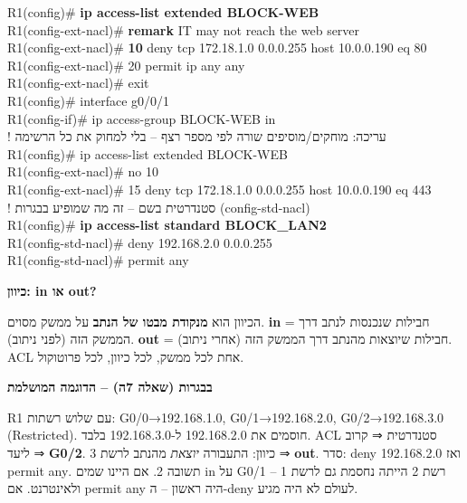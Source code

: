 \documentclass[11pt]{article}
\newcommand{\enLR}[1]{\textenglish{#1}}
\newcommand{\code}[1]{\textenglish{\codefont #1}}
\newcommand{\subheading}[1]{\vskip6pt{\bfseries\color{h3}#1\par}\vskip2pt}
\newcommand{\boxtitle}[1]{{\bfseries\color{boxti}#1}}
\newenvironment{exambox}{\colorlet{boxti}{exati}\begin{mdframed}[backgroundcolor=exabg,linecolor=exafr,rightline=true,leftline=false,topline=false,bottomline=false,linewidth=2pt,innertopmargin=6pt,innerbottommargin=6pt,innerleftmargin=8pt,innerrightmargin=8pt,skipabove=6pt,skipbelow=6pt]}{\end{mdframed}}
\begin{document}
\begin{codebox}\begin{english}\codefont\footnotesize\color{cfg}\setlength{\parindent}{0pt}
R1(config)\# \textcolor{cbold}{\textbf{ip access-list extended BLOCK-WEB}}\\
R1(config-ext-nacl)\# \textcolor{cbold}{\textbf{remark}} IT may not reach the web server\\
R1(config-ext-nacl)\# \textcolor{cbold}{\textbf{10}} deny tcp 172.18.1.0 0.0.0.255 host 10.0.0.190 eq 80\\
R1(config-ext-nacl)\# 20 permit ip any any\\
R1(config-ext-nacl)\# exit\\
R1(config)\# interface g0/0/1\\
R1(config-if)\# ip access-group BLOCK-WEB in\\
\textcolor{ccom}{\texthebrew{! עריכה: מוחקים/מוסיפים שורה לפי מספר רצף – בלי למחוק את כל הרשימה}}\\
R1(config)\# ip access-list extended BLOCK-WEB\\
R1(config-ext-nacl)\# no 10\\
R1(config-ext-nacl)\# 15 deny tcp 172.18.1.0 0.0.0.255 host 10.0.0.190 eq 443\\
\textcolor{ccom}{\texthebrew{! סטנדרטית בשם – זה מה שמופיע בבגרות \enLR{(config-std-nacl)}}}\\
R1(config)\# \textcolor{cbold}{\textbf{ip access-list standard BLOCK\_LAN2}}\\
R1(config-std-nacl)\# deny 192.168.2.0 0.0.0.255\\
R1(config-std-nacl)\# permit any
\end{english}\end{codebox}

\subheading{כיוון: \enLR{in} או \enLR{out}?}

הכיוון הוא \textbf{מנקודת מבטו של הנתב} על ממשק מסוים. \textbf{\enLR{in}} = חבילות שנכנסות לנתב דרך הממשק הזה (לפני ניתוב). \textbf{\enLR{out}} = חבילות שיוצאות מהנתב דרך הממשק הזה (אחרי ניתוב). \enLR{ACL} אחת לכל ממשק, לכל כיוון, לכל פרוטוקול.\par

\begin{exambox}\boxtitle{בבגרות (שאלה \enLR{7}ה) – הדוגמה המושלמת}\par  \enLR{R1} עם שלוש רשתות: \enLR{G0/0}→\enLR{192.168.1.0, G0/1}→\enLR{192.168.2.0, G0/2}→\enLR{192.168.3.0 (Restricted).} חוסמים את \enLR{192.168.2.0} ל-\enLR{192.168.3.0} בלבד. \enLR{ACL} סטנדרטית ⇒ קרוב ליעד ⇒ \textbf{\enLR{G0/2}}. כיוון: התעבורה \emph{יוצאת} מהנתב לרשת \enLR{3} ⇒ \textbf{\enLR{out}}. סדר: \code{deny 192.168.2.0} ואז \code{permit any}. תשובה \enLR{2.} אם היינו שמים \code{in} על \enLR{G0/1} – רשת \enLR{2} הייתה נחסמת גם לרשת \enLR{1} ולאינטרנט. אם \enLR{permit any} היה ראשון – ה-\enLR{deny} לעולם לא היה מגיע.\end{exambox}
\end{document}
